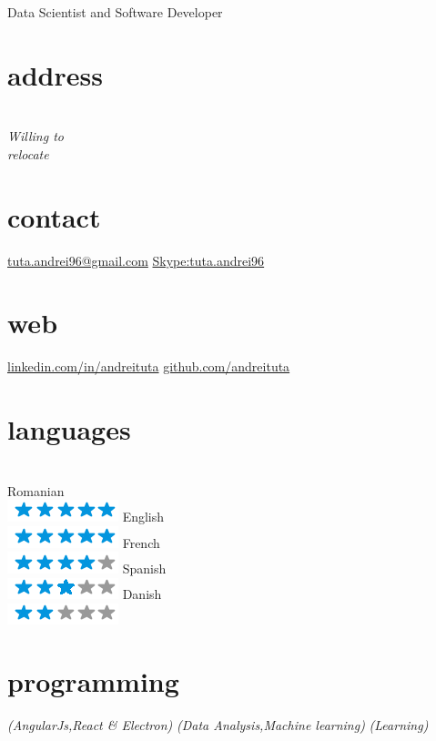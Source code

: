 \documentclass[]{friggeri-cv}
\begin{document}
       {Data Scientist and Software Developer}


\begin{aside}
  \section{address}
    \\
    \emph{Willing to \\relocate}
    ~
    \section{contact}
    \href{mailto:tuta.andrei96@gmail.com}{tuta.andrei96@gmail.com}
    \href{Skype : tuta.andrei96}{Skype:tuta.andrei96}
    ~
    \section{web}
    \href{http://linkedin.com/in/andreituta}{linkedin.com/in/andreituta}
    \href{http://github.com/andreituta}{github.com/andreituta}
    ~

  \section{languages}
  \\Romanian \\ \includegraphics[scale=0.30]{img/5stars.png}
  English \\ \includegraphics[scale=0.30]{img/5stars.png}
  French \\ \includegraphics[scale=0.30]{img/4stars.png}
  Spanish \\ \includegraphics[scale=0.30]{img/3stars.png}
  Danish \\ \includegraphics[scale=0.30]{img/2stars.png}
    ~

  \section{programming}
    \emph{(AngularJs,React \& Electron)}
     \emph{(Data Analysis,Machine learning)}
     \emph{(Learning)}
    ~

\end{aside}
\end{document}
